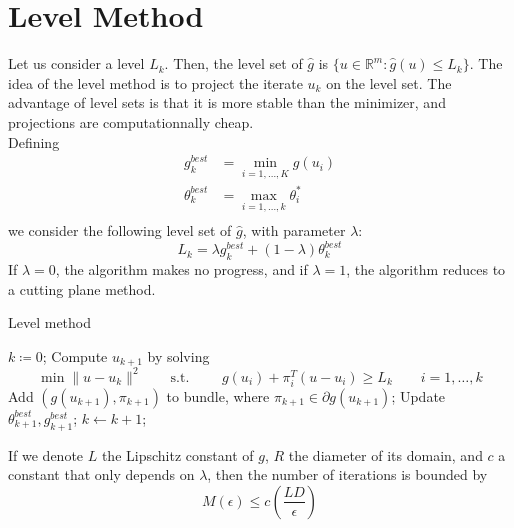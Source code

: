 \documentclass[12pt, openany]{report}
\newcommand{\R}{\mathbb{R}}
\theoremstyle{definition}
\begin{document}
\section{Level Method}
Let us consider a level $L_k$. Then, the level set of $\hat g$ is $\{u\in \R^m:\hat g(u)\le L_k\}$. The idea of the level method is to project the iterate $u_k$ on the level set. The advantage of level sets is that it is more stable than the minimizer, and projections are computationnally cheap. \\
Defining 
\begin{equation}
	\begin{aligned}
		g_k^{best} &= \min_{i=1,\dots,K}g(u_i)\\
		\theta_k^{best} &= \max_{i=1,\dots,k}\theta_i^*\\
	\end{aligned}
\end{equation}
we consider the following level set of $\hat g$, with parameter $\lambda$:
\begin{equation}
	L_k = \lambda g_k^{best} + (1-\lambda)\theta_k^{best}
\end{equation}
If $\lambda=0$, the algorithm makes no progress, and if $\lambda=1$, the algorithm reduces to a cutting plane method. \\
\begin{algorithm}[H]
	\caption{Level method}
	\label{algo:level_method}
	\begin{algorithmic}[1]
		\State $k\coloneqq 0$;
		\State Compute $u_{k+1}$ by solving 
		\begin{equation}
			\min \|u-u_k\|^2 \qquad \text{s.t. } \qquad g(u_i)+\pi_i^T (u-u_i)\ge L_k \qquad i=1,\dots,k
		\end{equation}
		\State Add $(g(u_{k+1}), \pi_{k+1})$ to bundle, where $\pi_{k+1}\in \partial g(u_{k+1})$;
		\State Update $\theta_{k+1}^{best}, g_{k+1}^{best}$;
		\State $k \gets k+1$;
		\EndWhile 
	\end{algorithmic}
\end{algorithm}
If we denote $L$ the Lipschitz constant of $g$, $R$ the diameter of its domain, and $c$ a constant that only depends on $\lambda$, then the number of iterations is bounded by 
\begin{equation}
	M(\epsilon) \le c\left(\frac{LD}{\epsilon}\right)
\end{equation}
\end{document}
